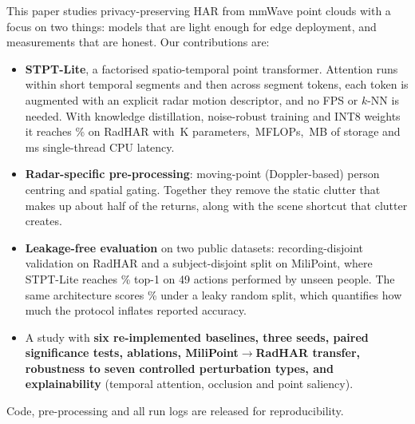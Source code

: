 This paper studies privacy-preserving HAR from mmWave point clouds with a focus
on two things: models that are light enough for edge deployment, and
measurements that are honest. Our contributions are:
\begin{itemize}
\item \textbf{STPT-Lite}, a factorised spatio-temporal point transformer.
  Attention runs within short temporal segments and then across segment tokens,
  each token is augmented with an explicit radar motion descriptor, and no FPS or
  $k$-NN is needed. With knowledge distillation, noise-robust training and INT8
  weights it reaches
  \rhOursAcc\% on RadHAR with \oursParamsK\,K parameters, \oursMflops\,MFLOPs,
  \oursIntMB\,MB of storage and \oursLat\,ms single-thread CPU latency.
\item \textbf{Radar-specific pre-processing}: moving-point (Doppler-based) person
  centring and spatial gating. Together they remove the static clutter that makes
  up about half of the returns, along with the scene shortcut that clutter
  creates.
\item \textbf{Leakage-free evaluation} on two public datasets: recording-disjoint
  validation on RadHAR and a subject-disjoint split on MiliPoint, where STPT-Lite
  reaches \mpOursAcc\% top-1 on 49 actions performed by unseen people. The same
  architecture scores \mpRandomAcc\% under a leaky random split, which quantifies how
  much the protocol inflates reported accuracy.
\item A study with \textbf{six re-implemented baselines, three seeds, paired
  significance tests, ablations, MiliPoint$\rightarrow$RadHAR transfer,
  robustness to seven controlled perturbation types, and explainability} (temporal attention,
  occlusion and point saliency).
\end{itemize}
Code, pre-processing and all run logs are released for reproducibility.
